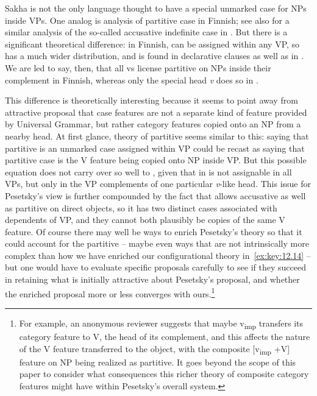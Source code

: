 \documentclass[output=paper]{langsci/langscibook}
\begin{document}
    \z
\z
Sakha is not the only language thought to have a special unmarked case for NPs
inside VPs. One analog is  analysis of partitive
case in Finnish; see also \citet{Baker2017} for a similar analysis of the
so-called accusative indefinite case in . But there is a significant
theoretical difference: in Finnish,  can be assigned within any
VP, so  has a much wider distribution, and is found in
declarative clauses as well as in . We are led to say, then, that
all vs license partitive on NPs inside their complement in Finnish, whereas
only the special head \emph{v}\textsubscript{\Imp} does so in .

This difference is theoretically interesting because it seems to point away
from  attractive proposal that case features are not a
separate kind of feature provided by Universal Grammar, but rather category
features copied onto an NP from a nearby head. At first glance,
 theory of partitive seems similar to this: saying that
partitive is an unmarked case assigned within VP could be recast as saying that
partitive case is the V feature being copied onto NP inside VP. But this
possible equation does not carry over so well to , given that in
  is not assignable in all VPs, but only in the VP
complements of one particular \emph{v}-like head. This issue for Pesetsky’s view is
further compounded by the fact that  allows accusative as well as
partitive on direct objects, so it has two distinct cases associated with
dependents of VP, and they cannot both plausibly be copies of the same V
feature.  Of course there may well be ways to enrich Pesetsky’s theory so that
it could account for the  partitive -- maybe even ways that are not
intrinsically more complex than how we have enriched our configurational theory
in~\eqref{ex:key:12.14} -- but one would have to evaluate specific proposals
carefully to see if they succeed in retaining what is initially attractive
about Pesetsky's proposal, and whether the enriched proposal more or less
converges with ours.\footnote{For example, an anonymous reviewer suggests that
    maybe v\textsubscript{imp} transfers its category feature to V, the head of
    its complement, and this affects the nature of the V feature transferred to
    the object, with the composite [v\textsubscript{imp} +V] feature on NP
    being realized as partitive.  It goes beyond the scope of this paper to
    consider what consequences this richer theory of composite category
features might have within Pesetsky’s overall system.}
\end{document}
